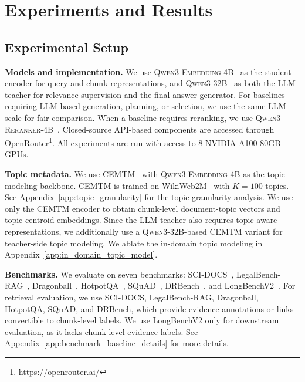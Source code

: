 \documentclass{llmxive}
\begin{document}
\section{Experiments and Results}

\subsection{Experimental Setup}
\label{sec:experimental_setup}

\noindent
\textbf{Models and implementation. }
We use \textsc{Qwen3-Embedding-4B}~\citep{zhang2025qwen3embeddingadvancingtext} as the student encoder for query and chunk representations, and \textsc{Qwen3-32B}~\citep{qwen3technicalreport} as both the LLM teacher for relevance supervision and the final answer generator. For baselines requiring LLM-based generation, planning, or selection, we use the same LLM scale for fair comparison. When a baseline requires reranking, we use \textsc{Qwen3-Reranker-4B}~\citep{zhang2025qwen3embeddingadvancingtext}. Closed-source API-based components are accessed through OpenRouter\footnote{\url{https://openrouter.ai/}}. All experiments are run with access to 8 NVIDIA A100 80GB GPUs.

\noindent
\textbf{Topic metadata. }
We use CEMTM~\cite{abaskohi-etal-2025-cemtm} with \textsc{Qwen3-Embedding-4B} as the topic modeling backbone. CEMTM is trained on WikiWeb2M~\cite{burns2023wiki} with $K=100$ topics. See Appendix~\ref{app:topic_granularity} for the topic granularity analysis. We use only the CEMTM encoder to obtain chunk-level document-topic vectors and topic centroid embeddings. Since the LLM teacher also requires topic-aware representations, we additionally use a \textsc{Qwen3-32B}-based CEMTM variant for teacher-side topic modeling. We ablate the in-domain topic modeling in Appendix~\ref{app:in_domain_topic_model}.

\noindent
\textbf{Benchmarks. }
We evaluate on seven benchmarks: SCI-DOCS~\cite{cohan-etal-2020-specter}, LegalBench-RAG~\cite{pipitone2024legalbenchragbenchmarkretrievalaugmentedgeneration}, Dragonball~\cite{zhu-etal-2025-rageval}, HotpotQA~\cite{yang-etal-2018-hotpotqa}, SQuAD~\cite{rajpurkar-etal-2016-squad}, DRBench~\cite{abaskohi2026drbench}, and LongBenchV2~\cite{bai-etal-2025-longbench}. For retrieval evaluation, we use SCI-DOCS, LegalBench-RAG, Dragonball, HotpotQA, SQuAD, and DRBench, which provide evidence annotations or links convertible to chunk-level labels. We use LongBenchV2 only for downstream evaluation, as it lacks chunk-level evidence labels. See Appendix~\ref{app:benchmark_baseline_details} for more details.
\end{document}

